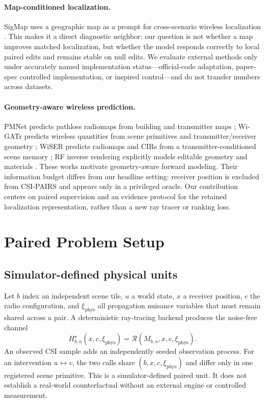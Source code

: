 \documentclass{article}
\newcommand{\method}{CSI-PAIRS}
\newcommand{\csi}{H}
\newcommand{\map}{M}
\begin{document}
\paragraph{Map-conditioned localization.}
SigMap uses a geographic map as a prompt for cross-scenario wireless
localization \citep{chu2026sigmap}.  This makes it a direct diagnostic neighbor:
our question is not whether a map improves matched localization, but whether
the model responds correctly to local paired edits and remains stable on null
edits.  We evaluate external methods only under accurately named implementation
status---official-code adaptation, paper-spec controlled implementation, or
inspired control---and do not transfer numbers across datasets.

\paragraph{Geometry-aware wireless prediction.}
PMNet predicts pathloss radiomaps from building and transmitter maps
\citep{lee2023pmnet}; Wi-GATr predicts wireless quantities from scene primitives
and transmitter/receiver geometry \citep{hehn2024wigatr}; WiSER predicts radiomaps and CIRs
from a transmitter-conditioned scene memory \citep{qiao2026wiser}; RF inverse
rendering explicitly models editable geometry and materials
\citep{wang2026rfir}.  These works motivate geometry-aware forward modeling.
Their information budget differs from our headline setting: receiver position
is excluded from \method{} and appears only in a privileged oracle.  Our
contribution centers on paired supervision and an evidence protocol for the
retained localization representation, rather than a new ray tracer or ranking
loss.

\section{Paired Problem Setup}

\subsection{Simulator-defined physical units}

Let $b$ index an independent scene tile, $u$ a world state, $x$ a receiver
position, $c$ the radio configuration, and $\xi_{\mathrm{phys}}$ all propagation
nuisance variables that must remain shared across a pair.  A deterministic
ray-tracing backend produces the noise-free channel
\begin{equation}
    \csi^{\star}_{b,u}(x,c,\xi_{\mathrm{phys}})
    =\mathcal{R}(\map_{b,u},x,c,\xi_{\mathrm{phys}}).
\end{equation}
An observed CSI sample adds an independently seeded observation process.  For
an intervention $u\leftrightarrow v$, the two calls share
$(b,x,c,\xi_{\mathrm{phys}})$ and differ only in one registered scene primitive.
This is a simulator-defined paired unit.  It does not establish a real-world
counterfactual without an external engine or controlled measurement.
\end{document}
